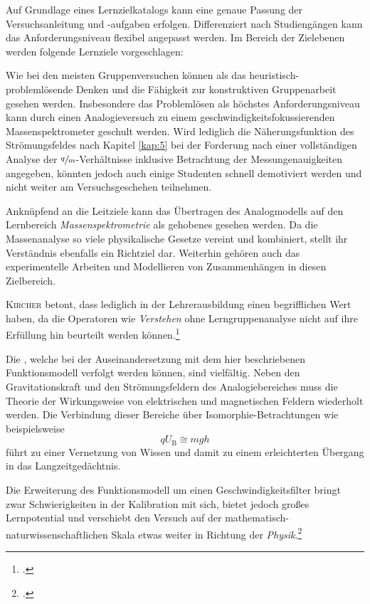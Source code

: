Auf Grundlage eines Lernzielkatalogs kann eine genaue Passung der Versuchsanleitung und -aufgaben erfolgen. Differenziert nach Studiengängen kann das Anforderungsniveau flexibel angepasst werden. Im Bereich der Zielebenen werden folgende Lernziele vorgeschlagen:
\begin{items}
\item Wie bei den meisten Gruppenversuchen können als  das heu{\-}ris{\-}tisch-problemlösende Denken und die Fähigkeit zur konstruktiven Gruppenarbeit gesehen werden. Insbesondere das Problemlösen als höchstes Anforderungsniveau kann durch einen Analogieversuch zu einem geschwindigkeitsfokussierenden Massenspektrometer geschult werden. Wird lediglich die Näherungsfunktion des Strömungsfeldes nach Kapitel \ref{kap:5} bei der Forderung nach einer vollständigen Analyse der $\sfrac{q}{m}$-Verhältnisse inklusive Betrachtung der Messungenauigkeiten angegeben, könnten jedoch auch einige Studenten schnell demotiviert werden und nicht weiter am Versuchsgeschehen teilnehmen.
\item Anknüpfend an die Leitziele kann das Übertragen des Analogmodells auf den Lernbereich \textit{Massenspektrometrie} als gehobenes  gesehen werden. Da die Massenanalyse so viele physikalische Gesetze vereint und kombiniert, stellt ihr Verständnis ebenfalls ein Richtziel dar. Weiterhin gehören auch das experimentelle Arbeiten und Modellieren von Zusammenhängen in diesen Zielbereich. 
\item \textsc{Kircher} betont, dass  lediglich in der Lehrerausbildung einen begrifflichen Wert haben, da die Operatoren wie \textit{Verstehen} ohne Lerngruppenanalyse nicht auf ihre Erfüllung hin beurteilt werden können.\footcite[vgl.][S\,86]{Kircher2013}
\item Die , welche bei der Auseinandersetzung mit dem hier beschriebenen Funktionsmodell verfolgt werden können, sind vielfältig. Neben den Gravitationskraft und den Strömungsfeldern des Analogiebereiches muss die Theorie der Wirkungsweise von elektrischen und magnetischen Feldern wiederholt werden. Die Verbindung dieser Bereiche über Isomorphie-Betrachtungen wie beispielsweise
\begin{equation*}
qU_\mathrm{B}\cong mgh
\end{equation*}
führt zu einer Vernetzung von Wissen und damit zu einem erleichterten Übergang in das Langzeitgedächtnis.
\end{items}
Die Erweiterung des Funktionsmodell um einen Geschwindigkeitsfilter bringt zwar Schwierigkeiten in der Kalibration mit sich, bietet jedoch großes Lernpotential und verschiebt den Versuch auf der mathematisch-naturwissenschaftlichen Skala etwas weiter in Richtung der \textit{Physik}.\vspace*{-1.5cm}\footcite[vgl.][, dessen Konzeption aufgrund der Limitationen des vorigen Analogiemodells eher auf die  ausgerichtet war. (S.\,48--49)]{Mais2014}\vspace*{1.5cm}

